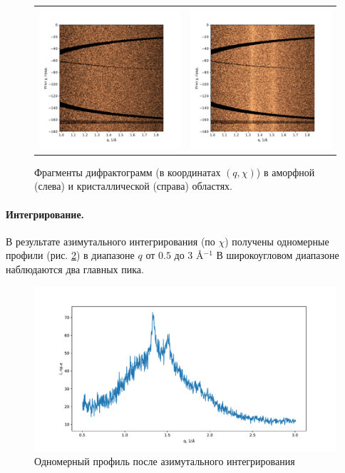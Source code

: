 		\begin{figure}[t]\center
\begin{tabular}{cc}
\includegraphics[width=0.5\linewidth]{fig/azim-amo.pdf}
&
\includegraphics[width=0.5\linewidth]{fig/azim-cryst.pdf}
\end{tabular}
\caption{Фрагменты дифрактограмм (в координатах $(q,\chi)$) в аморфной (слева) и кристаллической (справа) областях.}
\label{fig:azim}
\end{figure}
	
	
\paragraph{Интегрирование.}

В результате азимутального интегрирования (по $\chi$) получены одномерные профили  (рис. \ref{fig:waxs_profile}) в диапазоне $q$ от $0.5$ до $3$ \AA$^{-1}$
В широкоугловом диапазоне наблюдаются два главных пика.

\begin{figure}[h!]
    \centering
    \includegraphics[width = \linewidth]{fig/waxs_profile.pdf}
    \caption{Одномерный профиль после азимутального интегрирования}
    \label{fig:waxs_profile}
\end{figure}


